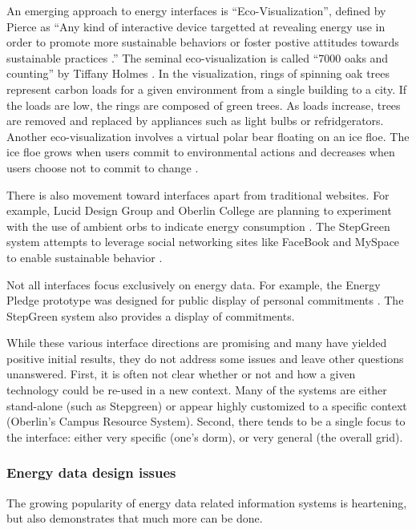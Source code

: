 An emerging approach to energy interfaces is ``Eco-Visualization'',
defined by Pierce as ``Any kind of interactive device targetted at
revealing energy use in order to promote more sustainable behaviors or
foster postive attitudes towards sustainable practices \cite{Pierce08}.''
The seminal eco-visualization is called ``7000 oaks and counting'' by
Tiffany Holmes \cite{Holmes07}.  In the visualization, rings of spinning
oak trees represent carbon loads for a given environment from a single
building to a city.  If the loads are low, the rings are composed of green
trees. As loads increase, trees are removed and replaced by appliances such
as light bulbs or refridgerators.  Another eco-visualization involves a
virtual polar bear floating on an ice floe. The ice floe grows when users
commit to environmental actions and decreases when users choose not to
commit to change \cite{Dillahunt08}.

There is also movement toward interfaces apart from traditional websites.
For example, Lucid Design Group and Oberlin College are planning to
experiment with the use of ambient orbs to indicate energy consumption
\cite{Peterson09}.  The StepGreen system attempts to leverage social
networking sites like FaceBook and MySpace to enable sustainable behavior
\cite{Mankoff07}.

Not all interfaces focus exclusively on energy data.  For example, the
Energy Pledge prototype was designed for public display of personal
commitments \cite{Pierce09}.  The StepGreen system also provides a display
of commitments.  

While these various interface directions are promising and many have
yielded positive initial results, they do not address some issues and leave
other questions unanswered. First, it is often not clear whether or not and
how a given technology could be re-used in a new context.  Many of the
systems are either stand-alone (such as Stepgreen) or appear highly
customized to a specific context (Oberlin's Campus Resource
System). Second, there tends to be a single focus to the interface: either
very specific (one's dorm), or very general (the overall grid).  

\subsubsection{Energy data design issues}

The growing popularity of energy data related information systems is
heartening, but also demonstrates that much more can be done. 


